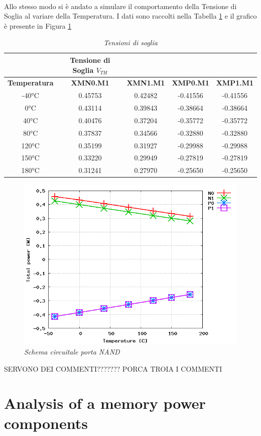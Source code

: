 \\
Allo stesso modo si è andato a simulare il comportamento della Tensione di Soglia al variare della Temperatura. I dati sono raccolti nella Tabella \ref{Tab5_24} e il grafico è presente in Figura \ref{TEMPVT}
\begin{table}[!h]\footnotesize
	\centering
	\begin{tabular}{|c|cccc|}
		\hline
		&\textbf{Tensione di Soglia} \textbf{$V_{TH}$}&&&\\
		\hline
		\textbf{Temperatura}&\textbf{XMN0.M1}&\textbf{XMN1.M1}&\textbf{XMP0.M1}&\textbf{XMP1.M1}\\
		\hline
		-40°C&0.45753&0.42482&-0.41556&-0.41556\\
		0°C&0.43114&0.39843&-0.38664&-0.38664\\
		40°C&0.40476&0.37204&-0.35772&-0.35772\\
		80°C&0.37837&0.34566&-0.32880&-0.32880\\
		120°C&0.35199&0.31927&-0.29988&-0.29988\\
		150°C&0.33220&0.29949&-0.27819&-0.27819\\
		180°C&0.31241&0.27970&-0.25650&-0.25650\\
		\hline
	\end{tabular}
	\caption{\textit{Tensioni di soglia}}
	\label{Tab5_24}
\end{table}
\begin{figure}[!htb]
	\centering
	\includegraphics[scale=0.55]{immagini/TEMPVT}
	\caption{\textit{Schema circuitale porta NAND}}
	\label{TEMPVT}
\end{figure}

SERVONO DEI COMMENTI??????? PORCA TROIA I COMMENTI

\section{Analysis of a memory power components}


